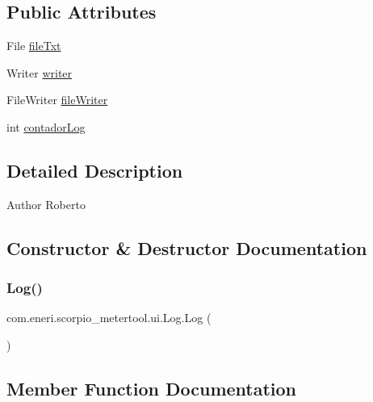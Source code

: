 \subsection*{Public Attributes}
\begin{DoxyCompactItemize}
\item 
File \hyperlink{classcom_1_1eneri_1_1scorpio__metertool_1_1ui_1_1_log_a971600e021ecca0bbd247ca65c7767ed}{file\+Txt}
\item 
Writer \hyperlink{classcom_1_1eneri_1_1scorpio__metertool_1_1ui_1_1_log_a3fc40d7fd6a3488ca5449c43d6db9c94}{writer}
\item 
File\+Writer \hyperlink{classcom_1_1eneri_1_1scorpio__metertool_1_1ui_1_1_log_af7b1949d8a0da0ecd9700ed95640d0ed}{file\+Writer}
\item 
int \hyperlink{classcom_1_1eneri_1_1scorpio__metertool_1_1ui_1_1_log_a33dfe536807af58043cdb1ecf3596ca8}{contador\+Log}
\end{DoxyCompactItemize}


\subsection{Detailed Description}
\begin{DoxyAuthor}{Author}
Roberto 
\end{DoxyAuthor}


\subsection{Constructor \& Destructor Documentation}
\mbox{\label{classcom_1_1eneri_1_1scorpio__metertool_1_1ui_1_1_log_a8a1bc533a22dfa6e5c6a50868ad8cf4d}} 
\subsubsection{\texorpdfstring{Log()}{Log()}}
{\footnotesize\ttfamily com.\+eneri.\+scorpio\+\_\+metertool.\+ui.\+Log.\+Log (\begin{DoxyParamCaption}{ }\end{DoxyParamCaption})}



\subsection{Member Function Documentation}
\mbox{\label{classcom_1_1eneri_1_1scorpio__metertool_1_1ui_1_1_log_a8e2117efd7a0284a440f5c3a9c995ebd}} 
